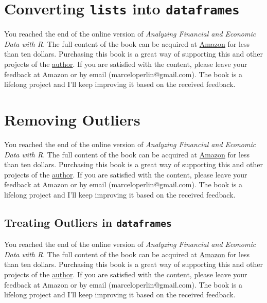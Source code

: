 \documentclass[
  12pt,
]{book}
\newenvironment{pleasebuyit}
{\begin{noteblock}
		
	} {\end{noteblock}}
\begin{document}
\hypertarget{converting-lists-into-dataframes}{%
\section{\texorpdfstring{Converting \texttt{lists} into \texttt{dataframes}}{Converting lists into dataframes}}\label{converting-lists-into-dataframes}}

\begin{pleasebuyit}
You reached the end of the online version of \emph{Analyzing Financial
and Economic Data with R}. The full content of the book can be acquired
at \href{https://www.amazon.com/dp/B084LSNXMN}{Amazon} for less than ten
dollars. Purchasing this book is a great way of supporting this and
other projects of the \href{https://www.msperlin.com/}{author}. If you
are satisfied with the content, please leave your feedback at Amazon or
by email (marceloperlin@gmail.com). The book is a lifelong project and
I'll keep improving it based on the received feedback.
\end{pleasebuyit}

\hypertarget{removing-outliers}{%
\section{Removing Outliers}\label{removing-outliers}}

\begin{pleasebuyit}
You reached the end of the online version of \emph{Analyzing Financial
and Economic Data with R}. The full content of the book can be acquired
at \href{https://www.amazon.com/dp/B084LSNXMN}{Amazon} for less than ten
dollars. Purchasing this book is a great way of supporting this and
other projects of the \href{https://www.msperlin.com/}{author}. If you
are satisfied with the content, please leave your feedback at Amazon or
by email (marceloperlin@gmail.com). The book is a lifelong project and
I'll keep improving it based on the received feedback.
\end{pleasebuyit}

\hypertarget{outliers}{%
\subsection{\texorpdfstring{Treating Outliers in \texttt{dataframes}}{Treating Outliers in dataframes}}\label{outliers}}

\begin{pleasebuyit}
You reached the end of the online version of \emph{Analyzing Financial
and Economic Data with R}. The full content of the book can be acquired
at \href{https://www.amazon.com/dp/B084LSNXMN}{Amazon} for less than ten
dollars. Purchasing this book is a great way of supporting this and
other projects of the \href{https://www.msperlin.com/}{author}. If you
are satisfied with the content, please leave your feedback at Amazon or
by email (marceloperlin@gmail.com). The book is a lifelong project and
I'll keep improving it based on the received feedback.
\end{pleasebuyit}
\end{document}
